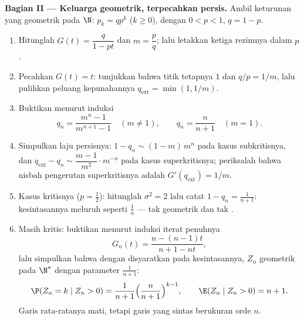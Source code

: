\begin{problem}
\medskip
\noindent\textbf{Bagian II --- Keluarga geometrik, terpecahkan
persis.} Ambil  keturunan yang geometrik pada $\N$: $p_k =
qp^k$ ($k \geq 0$), dengan $0 < p < 1$, $q = 1 - p$.
\begin{enumerate}[resume]
  \item Hitunglah $G(t) = \dfrac{q}{1 - pt}$ dan $m = \dfrac
        pq$; lalu letakkan ketiga rezimnya dalam $p$.
  \item Pecahkan $G(t) = t$: tunjukkan bahwa titik tetapnya $1$ dan
        $q/p = 1/m$, lalu pulihkan peluang kepunahannya
        $q_{\mathrm{ext}} = \min(1, 1/m)$.
  \item Buktikan menurut induksi 
        \[
        q_n = \frac{m^n - 1}{m^{n+1} - 1} \quad (m \neq 1),
        \qquad
        q_n = \frac{n}{n+1} \quad (m = 1).
        \]
  \item Simpulkan laju persisnya: $1 - q_n \sim (1 - m)\,m^n$
        pada kasus subkritisnya, dan $q_{\mathrm{ext}} - q_n
        \sim \dfrac{m - 1}{m^{2}}\cdot m^{-n}$ pada kasus
        superkritisnya; periksalah bahwa nisbah pengerutan
        superkritisnya adalah $G'(q_{\mathrm{ext}}) = 1/m$.
  \item Kasus kritisnya ($p = \tfrac12$): hitunglah $\sigma^2 =
        2$ lalu catat $1 - q_n = \frac1{n+1}$: kesintasannya meluruh
        seperti $\frac1n$ --- tak geometrik dan tak .
  \item Masih kritis: buktikan menurut induksi iterat penuhnya
        \[
        G_n(t) = \frac{n - (n-1)t}{n + 1 - nt},
        \]
        lalu simpulkan bahwa dengan disyaratkan pada kesintasannya, $Z_n$
        geometrik pada $\N^*$ dengan parameter $\frac1{n+1}$:
        \[
        \P(Z_n = k \mid Z_n > 0) = \frac1{n+1}
        \Bigl(\frac{n}{n+1}\Bigr)^{k-1},
        \qquad
        \E(Z_n \mid Z_n > 0) = n + 1 .
        \]
        Garis rata-ratanya mati, tetapi garis yang sintas berukuran
        orde $n$.
\end{enumerate}


\end{problem}
